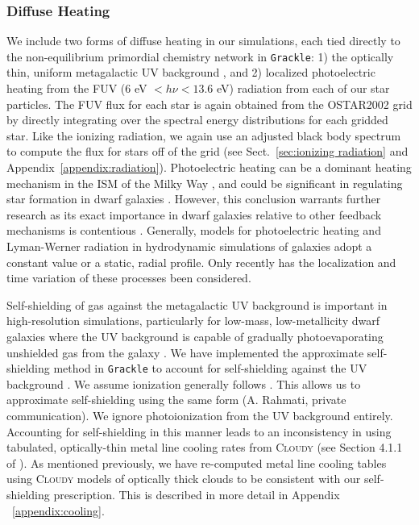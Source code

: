 \documentclass[twocolumn]{aastex61}
\begin{document}
\subsubsection{Diffuse  Heating}
\label{sec:diffusive heating}
We include two forms of diffuse heating in our simulations, each tied directly to the non-equilibrium primordial chemistry network in \texttt{Grackle}: 1) the optically thin, uniform metagalactic UV background \citep{HM2012}, and 2) localized photoelectric heating from the FUV (6 eV $<h\nu< 13.6$ eV) radiation from each of our star particles. The FUV flux for each star is again obtained from the OSTAR2002 grid by directly integrating over the spectral energy distributions for each gridded star. Like the ionizing radiation, we again use an adjusted black body spectrum to compute the flux for stars off of the grid (see Sect.~\ref{sec:ionizing radiation} and Appendix~\ref{appendix:radiation}). Photoelectric heating can be a dominant heating mechanism in the ISM of the Milky Way \citep{Parravano2003}, and could be significant in regulating star formation in dwarf galaxies \citep{Forbes2016}. However, this conclusion warrants further research as its exact importance in dwarf galaxies relative to other feedback mechanisms is contentious \citep{Hu2016,Hu2017}. Generally, models for photoelectric heating and Lyman-Werner radiation in hydrodynamic simulations of galaxies adopt a constant value or a static, radial profile. Only recently has the localization and time variation of these processes been considered.

Self-shielding of gas against the metagalactic UV background is important in high-resolution simulations, particularly for low-mass, low-metallicity dwarf galaxies where the UV background is capable of gradually photoevaporating unshielded gas from the galaxy \citep{Simpson2013}. We have implemented the \citet{Rahmati2013} approximate self-shielding method in \texttt{Grackle} to account for  self-shielding against the UV background \citep[see][ for more details of this implementation]{GrackleMethod}. We assume  ionization generally follows . This allows us to approximate  self-shielding using the same form (A. Rahmati, private communication). We ignore  photoionization from the UV background entirely. Accounting for self-shielding in this manner leads to an inconsistency in using tabulated, optically-thin metal line cooling rates from \textsc{Cloudy} (see Section 4.1.1 of \citet{Hu2017}). As mentioned previously, we have re-computed metal line cooling tables using \textsc{Cloudy} models of optically thick clouds to be consistent with our self-shielding prescription. This is described in more detail in Appendix ~\ref{appendix:cooling}. 
\end{document}
